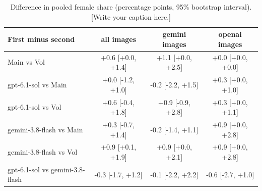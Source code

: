 \begin{table}[t]
\centering
\scriptsize
\begin{tabular}{@{}lccc@{}}
\toprule
First minus second & \textbf{all images} & \textbf{gemini images} & \textbf{openai images} \\
\midrule
Main vs Vol & +0.6 [+0.0, +1.4] & +1.1 [+0.0, +2.5] & +0.0 [+0.0, +0.0] \\
gpt-6.1-sol vs Main & +0.0 [-1.2, +1.0] & -0.2 [-2.2, +1.5] & +0.3 [+0.0, +1.0] \\
gpt-6.1-sol vs Vol & +0.6 [-0.4, +1.8] & +0.9 [-0.9, +2.8] & +0.3 [+0.0, +1.1] \\
gemini-3.8-flash vs Main & +0.3 [-0.7, +1.4] & -0.2 [-1.4, +1.1] & +0.9 [+0.0, +2.8] \\
gemini-3.8-flash vs Vol & +0.9 [+0.1, +1.9] & +0.9 [+0.0, +2.1] & +0.9 [+0.0, +2.8] \\
gpt-6.1-sol vs gemini-3.8-flash & -0.3 [-1.7, +1.2] & -0.1 [-2.2, +2.2] & -0.6 [-2.7, +1.0] \\
\bottomrule
\end{tabular}
\caption{Difference in pooled female share (percentage points, 95\% bootstrap interval). [Write your caption here.]}
\label{tab:female-share}
\end{table}
